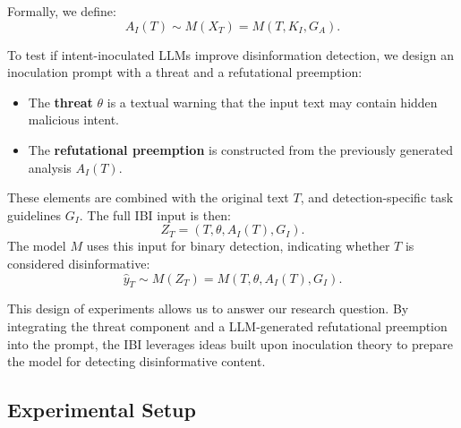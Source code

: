 \documentclass[11pt]{article}
\begin{document}
Formally, we define:
\begin{equation}
A_I(T) \sim M(X_T) = M(T, K_I, G_A).
\end{equation}



To test if intent-inoculated LLMs improve disinformation detection, we design an inoculation prompt with a threat and a refutational preemption:
\begin{itemize}[nosep, leftmargin=*]
  \item The \textbf{threat} \( \theta \) is a textual warning that the input text may contain hidden malicious intent.
  \item The \textbf{refutational preemption} is constructed from the previously generated analysis \( A_I(T) \).
\end{itemize} These elements are combined with the original text \( T \), and detection-specific task guidelines \( G_I \). The full IBI input is then:
\begin{equation}
Z_T = (T, \theta, A_I(T), G_I).
\end{equation}
The model \( M \) uses this input for binary detection, indicating whether \( T \) is considered disinformative:
\begin{equation}
\hat{y}_T \sim M(Z_T) = M(T, \theta, A_I(T), G_I).
\end{equation}

This design of experiments allows us to answer our research question. By integrating the threat component and a LLM-generated refutational preemption into the prompt, the IBI leverages ideas built upon inoculation theory to prepare the model for detecting disinformative content.




\subsection{Experimental Setup}
\end{document}
